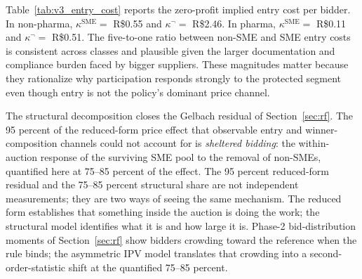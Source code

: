 Table~\ref{tab:v3_entry_cost} reports the zero-profit implied entry cost per bidder. In non-pharma, $\kappa^{\text{SME}} =$ R\$0.55 and $\kappa^{\neg} =$ R\$2.46. In pharma, $\kappa^{\text{SME}} =$ R\$0.11 and $\kappa^{\neg} =$ R\$0.51. The five-to-one ratio between non-SME and SME entry costs is consistent across classes and plausible given the larger documentation and compliance burden faced by bigger suppliers. These magnitudes matter because they rationalize why participation responds strongly to the protected segment even though entry is not the policy's dominant price channel.

The structural decomposition closes the Gelbach residual of Section~\ref{sec:rf}. The 95 percent of the reduced-form price effect that observable entry and winner-composition channels could not account for is \emph{sheltered bidding}: the within-auction response of the surviving SME pool to the removal of non-SMEs, quantified here at 75--85 percent of the effect. The 95 percent reduced-form residual and the 75--85 percent structural share are not independent measurements; they are two ways of seeing the same mechanism. The reduced form establishes that something inside the auction is doing the work; the structural model identifies what it is and how large it is. Phase-2 bid-distribution moments of Section~\ref{sec:rf} show bidders crowding toward the reference when the rule binds; the asymmetric IPV model translates that crowding into a second-order-statistic shift at the quantified 75--85 percent.
